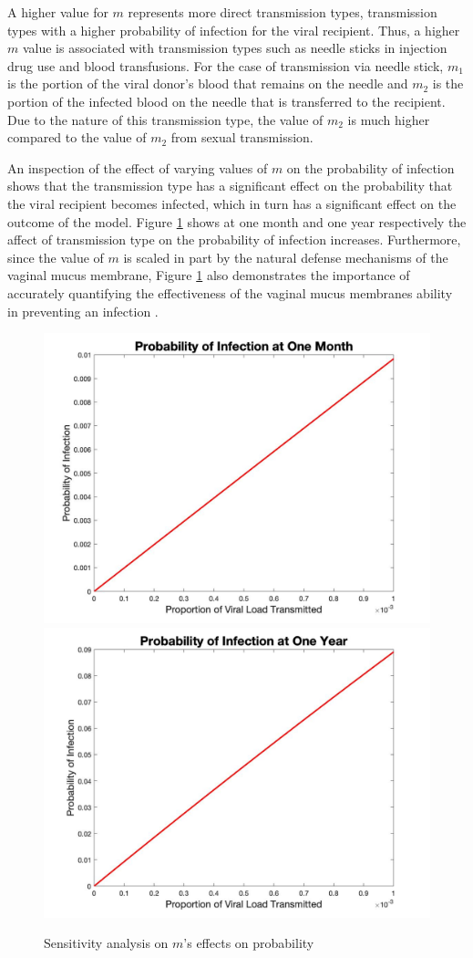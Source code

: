 \documentclass[]{elsarticle}
\theoremstyle{definition}
\begin{document}
A higher value for $m$ represents more direct transmission types, transmission types with a higher probability of infection for the viral recipient. Thus, a higher $m$ value is associated with transmission types such as needle sticks in injection drug use and blood transfusions.
For the case of transmission via needle stick, $m_1$ is the portion of the viral donor's blood that remains on the needle and $m_2$ is the portion of the infected blood on the needle that is transferred to the recipient. Due to the nature of this transmission type, the value of $m_2$ is much higher compared to the value of $m_2$ from sexual transmission.

An inspection of the effect of varying values of $m$ on the probability of infection shows that the transmission type has a significant effect on the probability that the viral recipient becomes infected, which in turn has a significant effect on the outcome of the model. Figure \ref{sens} shows at one month and one year respectively the affect of transmission type on the probability of infection increases. Furthermore, since the value of $m$ is scaled in part by the natural defense mechanisms of the vaginal mucus membrane, Figure \ref{sens} also demonstrates the importance of accurately quantifying the effectiveness of the vaginal mucus membranes ability in preventing an infection \cite{Owen2005}.

\begin{figure}[H]
    \centering
        \includegraphics[width=.49\linewidth]{MSENS2.jpg}
        \includegraphics[width=.49\linewidth]{MSENS4.jpg}
    \caption{Sensitivity analysis on $m$'s effects on probability}
    \label{sens}
\end{figure}
\end{document}
